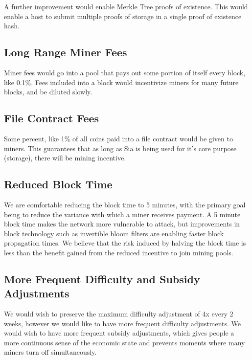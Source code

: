 \documentclass[twocolumn]{article}
\begin{document}
A further improvement would enable Merkle Tree proofs of existence.
This would enable a host to submit multiple proofs of storage in a single proof of existence hash.

\subsection{Long Range Miner Fees}
Miner fees would go into a pool that pays out some portion of itself every block, like 0.1\%.
Fees included into a block would incentivize miners for many future blocks, and be diluted slowly.

\subsection{File Contract Fees}
Some percent, like 1\% of all coins paid into a file contract would be given to miners.
This guarantees that as long as Sia is being used for it's core purpose (storage), there will be mining incentive.

\subsection{Reduced Block Time}
We are comfortable reducing the block time to 5 minutes, with the primary goal being to reduce the variance with which a miner receives payment.
A 5 minute block time makes the network more vulnerable to attack, but improvements in block technology such as invertible bloom filters \cite{ibf} are enabling faster block propagation times.
We believe that the risk induced by halving the block time is less than the benefit gained from the reduced incentive to join mining pools.

\subsection{More Frequent Difficulty and Subsidy Adjustments}
We would wish to preserve the maximum difficulty adjustment of 4x every 2 weeks, however we would like to have more frequent difficulty adjustments.
We would wish to have more frequent subsidy adjustments, which gives people a more continuous sense of the economic state and prevents moments where many miners turn off simultaneously.

\end{document}
